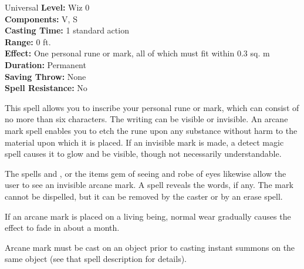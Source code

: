 {Universal}
{
	\textbf{Level:}
	Wiz 0\\
	\textbf{Components:}
	V, S\\
	\textbf{Casting Time:}
	1 standard action\\
	\textbf{Range:}
	0 ft.\\
	\textbf{Effect:}
	One personal rune or mark, all of which must fit within 0.3 sq. m\\
	\textbf{Duration:}
	Permanent\\
	\textbf{Saving Throw:}
	None\\
	\textbf{Spell Resistance:}
	No\\
}
{
	This spell allows you to inscribe your personal rune or mark, which can consist of no more than six characters. The writing can be visible or invisible. An arcane mark spell enables you to etch the rune upon any substance without harm to the material upon which it is placed. If an invisible mark is made, a detect magic spell causes it to glow and be visible, though not necessarily understandable.

	The spells  and , or the items gem of seeing and robe of eyes likewise allow the user to see an invisible arcane mark. A  spell reveals the words, if any. The mark cannot be dispelled, but it can be removed by the caster or by an erase spell.

	If an arcane mark is placed on a living being, normal wear gradually causes the effect to fade in about a month.

	Arcane mark must be cast on an object prior to casting instant summons on the same object (see that spell description for details).

}

